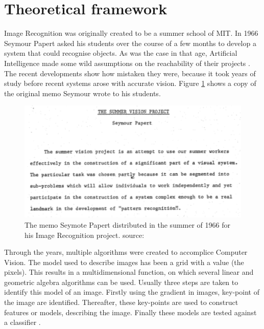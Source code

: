\section{Theoretical framework}
\label{sec:Theory}
Image Recognition was originally created to be a summer school of MIT.
In 1966 Seymour Papert asked his students over the course of a few months to develop a system that could recognise objects.
As was the case in that age, Artificial Intelligence made some wild assumptions on the reachability of their projects \citep{szeliski2010computer}.
The recent developments show how mistaken they were, because it took years of study before recent systems arose with accurate vision.
Figure \ref{fig:mit-note} shows a copy of the original memo Seymour wrote to his students.

\begin{figure}[h!bt]
\centering
\ifx\showfig\undefined
\includegraphics[keepaspectratio=true,width=.7\textwidth]{images/MITnote.png}\fi
\captionsetup{width=.7\textwidth}
\caption{The memo Seymote Papert distributed in the summer of 1966 for his Image Recognition project. source: \citet{mensink12phd}}
\label{fig:mit-note}
\end{figure}

Through the years, multiple algorithms were created to accomplice Computer Vision.
The model used to describe images has been a grid with a value (the pixels).
This results in a multidimensional function, on which several linear and geometric algebra algorithms can be used.
Usually three steps are taken to identify this model of an image.
Firstly using the gradient in images, key-point of the image are identified.
Thereafter, these key-points are used to construct features or models, describing the image.
Finally these models are tested against a classifier \citep{szeliski2010computer}.

